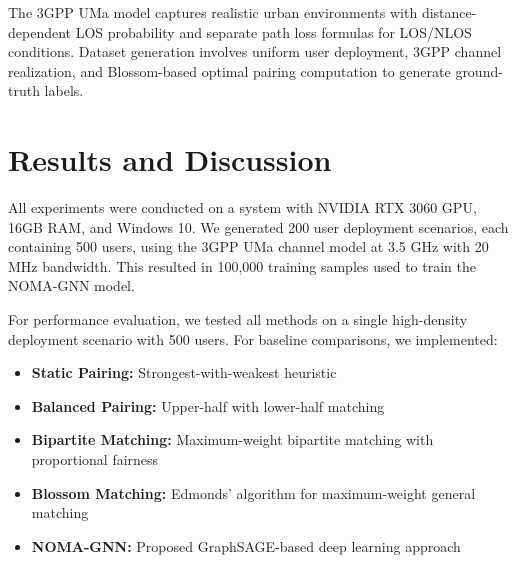 \documentclass[conference]{IEEEtran}
\begin{document}
The 3GPP UMa model captures realistic urban environments with distance-dependent LOS probability and separate path loss formulas for LOS/NLOS conditions. Dataset generation involves uniform user deployment, 3GPP channel realization, and Blossom-based optimal pairing computation to generate ground-truth labels.


\section{Results and Discussion}
All experiments were conducted on a system with NVIDIA RTX 3060 GPU, 16GB RAM, and Windows 10. We generated 200 user deployment scenarios, each containing 500 users, using the 3GPP UMa channel model at 3.5 GHz with 20 MHz bandwidth. This resulted in 100,000 training samples used to train the NOMA-GNN model.

For performance evaluation, we tested all methods on a single high-density deployment scenario with 500 users. For baseline comparisons, we implemented:
\begin{itemize}
    \item \textbf{Static Pairing:} Strongest-with-weakest heuristic
    \item \textbf{Balanced Pairing:} Upper-half with lower-half matching
    \item \textbf{Bipartite Matching:} Maximum-weight bipartite matching with proportional fairness
    \item \textbf{Blossom Matching:} Edmonds' algorithm for maximum-weight general matching
    \item \textbf{NOMA-GNN:} Proposed GraphSAGE-based deep learning approach
\end{itemize}
\end{document}
